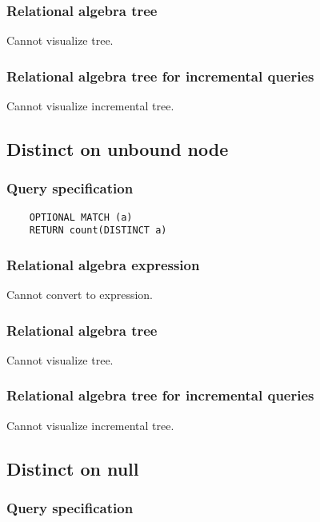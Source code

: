 	\subsubsection*{Relational algebra tree}

	Cannot visualize tree.

	\subsubsection*{Relational algebra tree for incremental queries}

	Cannot visualize incremental tree.
	\subsection{Distinct on unbound node}

	\subsubsection*{Query specification}

	\begin{lstlisting}
	OPTIONAL MATCH (a)
	RETURN count(DISTINCT a)
	\end{lstlisting}


	\subsubsection*{Relational algebra expression}

	Cannot convert to expression.

	\subsubsection*{Relational algebra tree}

	Cannot visualize tree.

	\subsubsection*{Relational algebra tree for incremental queries}

	Cannot visualize incremental tree.
	\subsection{Distinct on null}

	\subsubsection*{Query specification}

